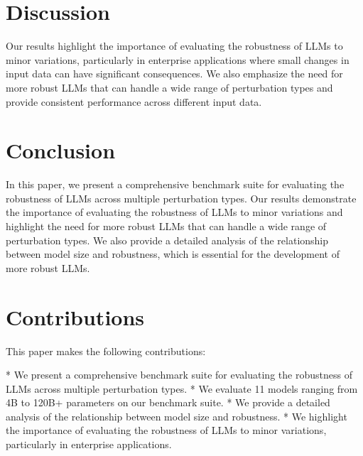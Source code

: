 \documentclass{article}
\begin{document}
\section{Discussion}

Our results highlight the importance of evaluating the robustness of LLMs to minor variations, particularly in enterprise applications where small changes in input data can have significant consequences. We also emphasize the need for more robust LLMs that can handle a wide range of perturbation types and provide consistent performance across different input data.

\section{Conclusion}

In this paper, we present a comprehensive benchmark suite for evaluating the robustness of LLMs across multiple perturbation types. Our results demonstrate the importance of evaluating the robustness of LLMs to minor variations and highlight the need for more robust LLMs that can handle a wide range of perturbation types. We also provide a detailed analysis of the relationship between model size and robustness, which is essential for the development of more robust LLMs.

\section{Contributions}

This paper makes the following contributions:

* We present a comprehensive benchmark suite for evaluating the robustness of LLMs across multiple perturbation types.
* We evaluate 11 models ranging from 4B to 120B+ parameters on our benchmark suite.
* We provide a detailed analysis of the relationship between model size and robustness.
* We highlight the importance of evaluating the robustness of LLMs to minor variations, particularly in enterprise applications.
\end{document}
